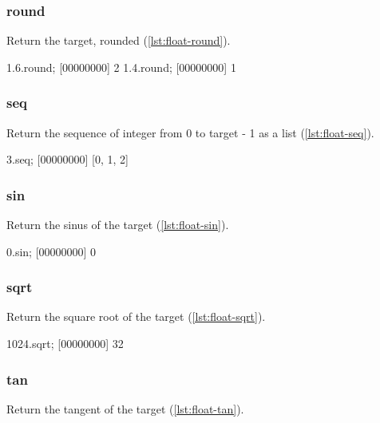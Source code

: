 \subsubsection{round}

Return the target, rounded (\autoref{lst:float-round}).

\begin{urbiscript}[caption=Float.round, label=lst:float-round,
  float=\floatposh]
  1.6.round;
  [00000000] 2
  1.4.round;
  [00000000] 1
\end{urbiscript}

\subsubsection{seq}

Return the sequence of integer from 0 to target - 1 as a list (\autoref{lst:float-seq}).

\begin{urbiscript}[caption=Float.seq, label=lst:float-seq,
  float=\floatposh]
  3.seq;
  [00000000] [0, 1, 2]
\end{urbiscript}

\subsubsection{sin}

Return the sinus of the target (\autoref{lst:float-sin}).

\begin{urbiscript}[caption=Float.sin, label=lst:float-sin,
  float=\floatposh]
  0.sin;
  [00000000] 0
\end{urbiscript}

\subsubsection{sqrt}

Return the square root of the target (\autoref{lst:float-sqrt}).

\begin{urbiscript}[caption=Float.sqrt, label=lst:float-sqrt,
  float=\floatposh]
  1024.sqrt;
  [00000000] 32
\end{urbiscript}

\subsubsection{tan}

Return the tangent of the target (\autoref{lst:float-tan}).

